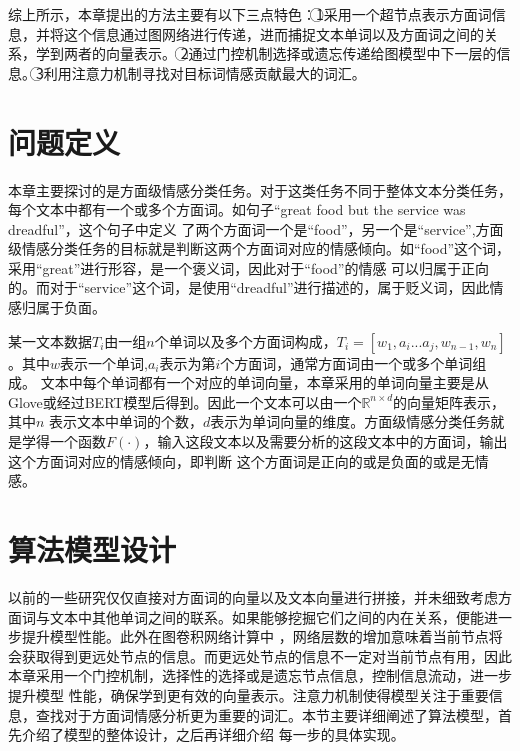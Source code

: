 综上所示，本章提出的方法主要有以下三点特色：\noindent\textcircled{1}采用一个超节点表示方面词信息，并将这个信息通过图网络进行传递，进而捕捉文本单词以及方面词之间的关系，学到两者的向量表示。
\noindent\textcircled{2}通过门控机制选择或遗忘传递给图模型中下一层的信息。\noindent\textcircled{3}利用注意力机制寻找对目标词情感贡献最大的词汇。

\section{问题定义}
本章主要探讨的是方面级情感分类任务。对于这类任务不同于整体文本分类任务，每个文本中都有一个或多个方面词。如句子“great food but the service was dreadful”，这个句子中定义
了两个方面词一个是“food”，另一个是“service”,方面级情感分类任务的目标就是判断这两个方面词对应的情感倾向。如“food”这个词，采用“great”进行形容，是一个褒义词，因此对于“food”的情感
可以归属于正向的。而对于“service”这个词，是使用“dreadful”进行描述的，属于贬义词，因此情感归属于负面。

某一文本数据$T_i$由一组$n$个单词以及多个方面词构成，$T_i=[w_1,a_{i}...a_{j},w_{n-1},w_n]$。其中$w$表示一个单词,$a_i$表示为第$i$个方面词，通常方面词由一个或多个单词组成。
文本中每个单词都有一个对应的单词向量，本章采用的单词向量主要是从Glove或经过BERT模型后得到。因此一个文本可以由一个$\mathbb{R}^{n\times d}$的向量矩阵表示，其中$n$
表示文本中单词的个数，$d$表示为单词向量的维度。方面级情感分类任务就是学得一个函数$F(\cdot)$，输入这段文本以及需要分析的这段文本中的方面词，输出这个方面词对应的情感倾向，即判断
这个方面词是正向的或是负面的或是无情感。

\section{算法模型设计}
以前的一些研究仅仅直接对方面词的向量以及文本向量进行拼接，并未细致考虑方面词与文本中其他单词之间的联系。如果能够挖掘它们之间的内在关系，便能进一步提升模型性能。此外在图卷积网络计算中
，网络层数的增加意味着当前节点将会获取得到更远处节点的信息。而更远处节点的信息不一定对当前节点有用，因此本章采用一个门控机制，选择性的选择或是遗忘节点信息，控制信息流动，进一步提升模型
性能，确保学到更有效的向量表示。注意力机制使得模型关注于重要信息，查找对于方面词情感分析更为重要的词汇。本节主要详细阐述了算法模型，首先介绍了模型的整体设计，之后再详细介绍
每一步的具体实现。

